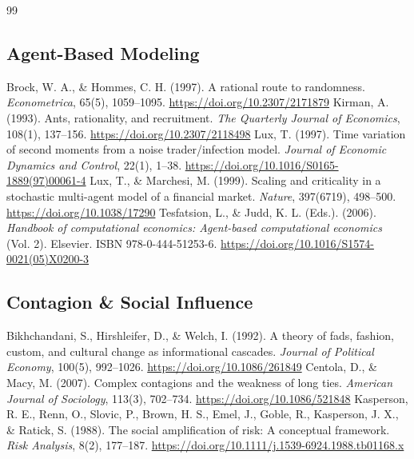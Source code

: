 \documentclass[11pt]{article}
\begin{document}
\begin{thebibliography}{99}
\subsection{Agent-Based Modeling}
 Brock, W. A., \& Hommes, C. H. (1997). A rational route to randomness. \textit{Econometrica}, 65(5), 1059--1095. \url{https://doi.org/10.2307/2171879}
 Kirman, A. (1993). Ants, rationality, and recruitment. \textit{The Quarterly Journal of Economics}, 108(1), 137--156. \url{https://doi.org/10.2307/2118498}
 Lux, T. (1997). Time variation of second moments from a noise trader/infection model. \textit{Journal of Economic Dynamics and Control}, 22(1), 1--38. \url{https://doi.org/10.1016/S0165-1889(97)00061-4}
 Lux, T., \& Marchesi, M. (1999). Scaling and criticality in a stochastic multi-agent model of a financial market. \textit{Nature}, 397(6719), 498--500. \url{https://doi.org/10.1038/17290}
 Tesfatsion, L., \& Judd, K. L. (Eds.). (2006). \textit{Handbook of computational economics: Agent-based computational economics} (Vol. 2). Elsevier. ISBN 978-0-444-51253-6. \url{https://doi.org/10.1016/S1574-0021(05)X0200-3}
\subsection{Contagion \& Social Influence}
 Bikhchandani, S., Hirshleifer, D., \& Welch, I. (1992). A theory of fads, fashion, custom, and cultural change as informational cascades. \textit{Journal of Political Economy}, 100(5), 992--1026. \url{https://doi.org/10.1086/261849}
 Centola, D., \& Macy, M. (2007). Complex contagions and the weakness of long ties. \textit{American Journal of Sociology}, 113(3), 702--734. \url{https://doi.org/10.1086/521848}
 Kasperson, R. E., Renn, O., Slovic, P., Brown, H. S., Emel, J., Goble, R., Kasperson, J. X., \& Ratick, S. (1988). The social amplification of risk: A conceptual framework. \textit{Risk Analysis}, 8(2), 177--187. \url{https://doi.org/10.1111/j.1539-6924.1988.tb01168.x}

\end{thebibliography}
\end{document}
